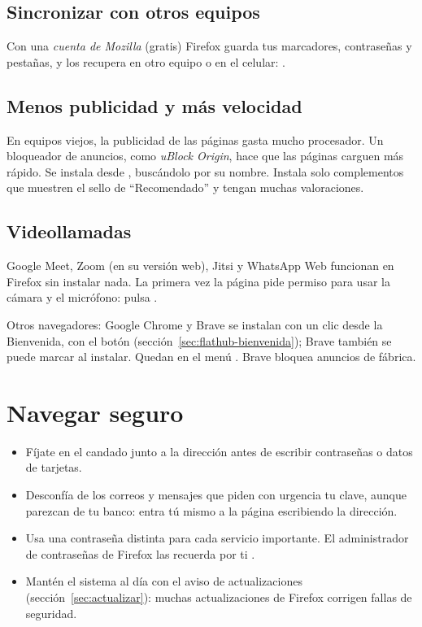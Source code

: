 \subsection{Sincronizar con otros equipos}
Con una \emph{cuenta de Mozilla} (gratis) Firefox guarda tus marcadores,
contraseñas y pestañas, y los recupera en otro equipo o en el celular:
.

\subsection{Menos publicidad y más velocidad}
En equipos viejos, la publicidad de las páginas gasta mucho procesador. Un
bloqueador de anuncios, como \emph{uBlock Origin}, hace que las páginas
carguen más rápido. Se instala desde ,
buscándolo por su nombre. Instala solo complementos que muestren el sello
de \enquote{Recomendado} y tengan muchas valoraciones.

\subsection{Videollamadas}
Google Meet, Zoom (en su versión web), Jitsi y WhatsApp Web funcionan en
Firefox sin instalar nada. La primera vez la página pide permiso para usar
la cámara y el micrófono: pulsa .

\begin{consejo}
Otros navegadores: Google Chrome y Brave se instalan con un clic desde la
Bienvenida, con el botón 
(sección~\ref{sec:flathub-bienvenida}); Brave también se puede marcar al
instalar. Quedan en el menú . Brave bloquea anuncios de
fábrica.
\end{consejo}

\section{Navegar seguro}

\begin{itemize}
  \item Fíjate en el candado junto a la dirección antes de escribir
        contraseñas o datos de tarjetas.
  \item Desconfía de los correos y mensajes que piden con urgencia tu clave,
        aunque parezcan de tu banco: entra tú mismo a la página escribiendo
        la dirección.
  \item Usa una contraseña distinta para cada servicio importante. El
        administrador de contraseñas de Firefox las recuerda por ti
        \cite{incibe-contrasenas}.
  \item Mantén el sistema al día con el aviso de actualizaciones
        (sección~\ref{sec:actualizar}): muchas actualizaciones de Firefox
        corrigen fallas de seguridad.
\end{itemize}

\fuentes
